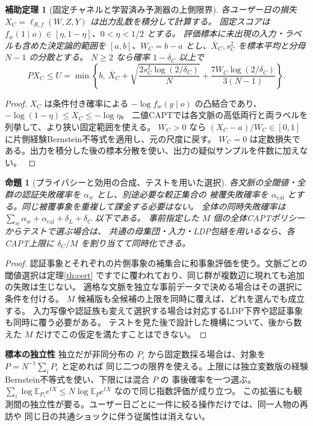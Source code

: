 \documentclass[a4paper,11pt]{ltjsarticle}
\theoremstyle{jp}
\newtheorem{prop}[thm]{命題}
\newtheorem{lem}[thm]{補助定理}
\newcommand{\E}{\mathbb E}
\newcommand{\para}[1]{\par\Needspace{3\baselineskip}\addvspace{.6\baselineskip}\noindent\textbf{#1}\enspace}
\begin{document}
\begin{lem}[固定チャネルと学習済み予測器の上側限界]\label{th:captupper}
各ユーザー日の損失 \(X_C=\ell_{R,f}(W,Z,Y)\) は出力乱数を積分して計算する。
固定スコアは \(f_w(1\mid o)\in[\eta,1-\eta]\)、\(0<\eta<1/2\) とする。
評価標本に未出現の入力・ラベルも含めた決定論的範囲を
\([a,b]\)、\(W_C=b-a\) とし、\(\bar X_C,s_C^2\) を標本平均と分母 \(N-1\) の分散とする。
\(N\ge2\) なら確率 \(1-\delta_C\) 以上で
\[
 PX_C\le U=\min\!\left\{b,\ \bar X_C+
 \sqrt{\frac{2s_C^2\log(2/\delta_C)}N}
 +\frac{7W_C\log(2/\delta_C)}{3(N-1)}\right\}.
 \tag{10}\label{eq:ucb}
\]
\end{lem}
\begin{proof}
\(X_C\) は条件付き確率による \(-\log f_w(y\mid o)\) の凸結合であり、
\(-\log(1-\eta)\le X_C\le-\log\eta\)。
二値CAPTでは各文脈の高低両行と両ラベルを列挙して、より狭い固定範囲を使える。
\(W_C>0\) なら \((X_C-a)/W_C\in[0,1]\) に片側経験Bernstein不等式を適用し、元の尺度に戻す。
\(W_C=0\) は定数損失である。出力を積分した後の標本分散を使い、出力の疑似サンプルを件数に加えない。
\cite{bernstein}
\end{proof}

\begin{prop}[プライバシーと効用の合成、テストを用いた選択]\label{th:joint}
各文脈の全閾値・全群の認証失敗確率を \(\alpha_w\) とし、別途必要な較正集合の
被覆失敗確率を \(\alpha_{\mathrm{cal}}\) とする。同じ被覆事象を重複して課金する必要はない。
全体の同時失敗確率は \(\sum_w\alpha_w+\alpha_{\mathrm{cal}}+\delta_L+\delta_C\) 以下である。
事前指定した \(M\) 個の全体CAPTポリシーからテストで選ぶ場合は、
共通の母集団・入力・LDP包絡を用いるなら、各CAPT上限に \(\delta_C/M\) を割り当てて同時化できる。
\end{prop}
\begin{proof}
認証事象とそれぞれの片側事象の補集合に和事象評価を使う。文脈ごとの閾値選択は定理\ref{th:cert}
ですでに覆われており、同じ群が複数辺に現れても追加の失敗は生じない。
適格な文脈を独立な事前データで決める場合はその選択に条件を付ける。
\(M\) 候補版も全候補の上限を同時に覆えば、どれを選んでも成立する。
入力写像や認証族も変えて選択する場合は対応するLDP下界や認証事象も同時に覆う必要がある。
テストを見た後で設計した機構について、後から数えた \(M\) だけでこの仮定を満たすことはできない。
\end{proof}

\para{標本の独立性}
独立だが非同分布の \(P_i\) から固定数採る場合は、対象を \(P=N^{-1}\sum_iP_i\) と定めれば
同じ二つの限界を使える。上限には独立変数版の経験Bernstein不等式を使い、下限には混合 \(P\) の
事後確率を一つ選ぶ。\(\sum_i\log \E_{P_i}e^{tX}\le N\log\E_Pe^{tX}\) なので同じ指数評価が成り立つ。
この拡張にも観測間の独立性が要る。ユーザー日ごとに一件に絞る操作だけでは、同一人物の再訪や
同じ日の共通ショックに伴う従属性は消えない。\cite{bernstein}
\end{document}
